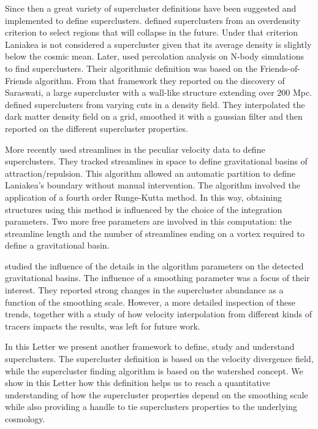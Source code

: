 \documentclass[usenatbib]{mnras}
\begin{document}
Since then a great variety of supercluster definitions have been suggested and implemented to define superclusters. 
\cite{2015A&A...575L..14C} defined superclusters from an overdensity criterion to select regions that will collapse in the future.
Under that criterion Laniakea is not considered a supercluster given that its average density is slightly below the cosmic mean.
Later, \cite{Bagchi_2017} used percolation analysis on N-body simulations to find superclusters. 
Their algorithmic definition was based on the Friends-of-Friends algorithm.
From that framework they reported on the discovery of Saraswati, a large supercluster with a wall-like structure extending over $200$ Mpc.
\cite{Einasto_2019} defined superclusters from varying cuts in a density field. 
They interpolated the dark matter density field on a grid, smoothed it with a gaussian filter and then reported on the different supercluster properties.

More recently \cite{Dupuy_2019} used streamlines in the peculiar velocity data to define 
superclusters. 
They tracked streamlines in space to define gravitational basins of attraction/repulsion.
This algorithm allowed an automatic partition to define Laniakea's boundary without manual intervention.
The algorithm involved the application of a
fourth order Runge-Kutta method. 
In this way, obtaining structures using this method is influenced by the choice of the integration parameters. 
Two more free parameters are involved in this computation: the streamline length and the number of streamlines ending on a vortex required to define a gravitational basin.

\cite{Dupuy_2020} studied the influence of the details in
the algorithm parameters on the detected gravitational basins.
The influence of a smoothing parameter was a focus of their interest. 
They reported strong changes in the supercluster abundance as a function of the smoothing scale.
However, a more detailed inspection of these trends, together with a study of how velocity interpolation from different kinds of tracers impacts the results, was left for future work.

In this Letter we present another framework to define, study and understand superclusters. 
The supercluster definition is based on the velocity divergence field, while
the supercluster finding algorithm is based on the watershed concept.
We show in this Letter how this definition helps us to reach a quantitative understanding of how the supercluster properties depend on the smoothing scale while also providing a handle to tie superclusters properties to the underlying cosmology.
\end{document}
